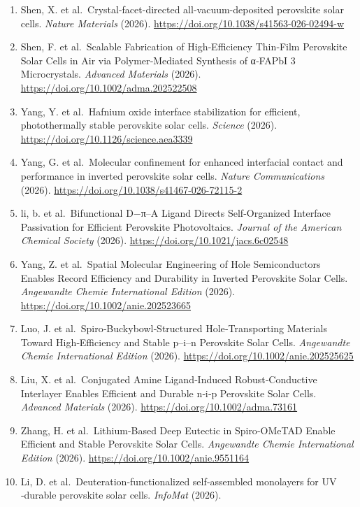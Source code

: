 \documentclass[
  11pt,
]{article}
\begin{document}
\begin{enumerate}
  \url{https://doi.org/10.1021/jacs.5c18303}
\item
  Shen, X. et al.~Crystal-facet-directed all-vacuum-deposited perovskite
  solar cells. \emph{Nature Materials} (2026).
  \url{https://doi.org/10.1038/s41563-026-02494-w}
\item
  Shen, F. et al.~Scalable Fabrication of High‐Efficiency Thin‐Film
  Perovskite Solar Cells in Air via Polymer‐Mediated Synthesis of
  α‐FAPbI 3 Microcrystals. \emph{Advanced Materials} (2026).
  \url{https://doi.org/10.1002/adma.202522508}
\item
  Yang, Y. et al.~Hafnium oxide interface stabilization for efficient,
  photothermally stable perovskite solar cells. \emph{Science} (2026).
  \url{https://doi.org/10.1126/science.aea3339}
\item
  Yang, G. et al.~Molecular confinement for enhanced interfacial contact
  and performance in inverted perovskite solar cells. \emph{Nature
  Communications} (2026).
  \url{https://doi.org/10.1038/s41467-026-72115-2}
\item
  li, b. et al.~Bifunctional D−π--A Ligand Directs Self-Organized
  Interface Passivation for Efficient Perovskite Photovoltaics.
  \emph{Journal of the American Chemical Society} (2026).
  \url{https://doi.org/10.1021/jacs.6c02548}
\item
  Yang, Z. et al.~Spatial Molecular Engineering of Hole Semiconductors
  Enables Record Efficiency and Durability in Inverted Perovskite Solar
  Cells. \emph{Angewandte Chemie International Edition} (2026).
  \url{https://doi.org/10.1002/anie.202523665}
\item
  Luo, J. et al.~Spiro‐Buckybowl‐Structured Hole‐Transporting Materials
  Toward High‐Efficiency and Stable p--i--n Perovskite Solar Cells.
  \emph{Angewandte Chemie International Edition} (2026).
  \url{https://doi.org/10.1002/anie.202525625}
\item
  Liu, X. et al.~Conjugated Amine Ligand‐Induced Robust‐Conductive
  Interlayer Enables Efficient and Durable n‐i‐p Perovskite Solar Cells.
  \emph{Advanced Materials} (2026).
  \url{https://doi.org/10.1002/adma.73161}
\item
  Zhang, H. et al.~Lithium‐Based Deep Eutectic in Spiro‐OMeTAD Enable
  Efficient and Stable Perovskite Solar Cells. \emph{Angewandte Chemie
  International Edition} (2026).
  \url{https://doi.org/10.1002/anie.9551164}
\item
  Li, D. et al.~Deuteration‐functionalized self‐assembled monolayers for
  UV ‐durable perovskite solar cells. \emph{InfoMat} (2026).

\end{enumerate}
\end{document}
